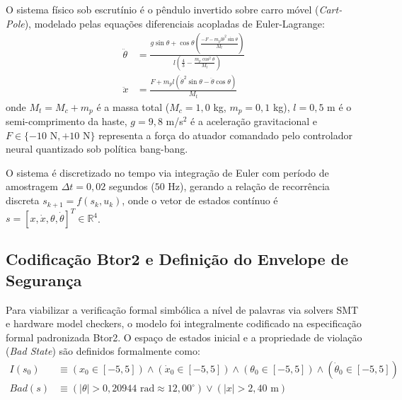 \documentclass[11pt,a4paper]{article}
\theoremstyle{definition}
\begin{document}
O sistema físico sob escrutínio é o pêndulo invertido sobre carro móvel (\textit{Cart-Pole}), modelado pelas equações diferenciais acopladas de Euler-Lagrange:
\begin{align}
    \ddot{\theta} &= \frac{g \sin\theta + \cos\theta \left( \frac{-F - m_p l \dot{\theta}^2 \sin\theta}{M_t} \right)}{l \left( \frac{4}{3} - \frac{m_p \cos^2\theta}{M_t} \right)} \\
    \ddot{x} &= \frac{F + m_p l (\dot{\theta}^2 \sin\theta - \ddot{\theta} \cos\theta)}{M_t}
\end{align}
onde $M_t = M_c + m_p$ é a massa total ($M_c = 1,0$ kg, $m_p = 0,1$ kg), $l = 0,5$ m é o semi-comprimento da haste, $g = 9,8$ m/s$^2$ é a aceleração gravitacional e $F \in \{-10\text{ N}, +10\text{ N}\}$ representa a força do atuador comandado pelo controlador neural quantizado sob política bang-bang.

O sistema é discretizado no tempo via integração de Euler com período de amostragem $\Delta t = 0,02$ segundos ($50$ Hz), gerando a relação de recorrência discreta $s_{k+1} = f(s_k, u_k)$, onde o vetor de estados contínuo é $s = [x, \dot{x}, \theta, \dot{\theta}]^T \in \mathbb{R}^4$.

\subsection{Codificação Btor2 e Definição do Envelope de Segurança}

Para viabilizar a verificação formal simbólica a nível de palavras via solvers SMT e hardware model checkers, o modelo foi integralmente codificado na especificação formal padronizada Btor2. O espaço de estados inicial e a propriedade de violação (\textit{Bad State}) são definidos formalmente como:
\begin{align}
    I(s_0) &\equiv (x_0 \in [-5, 5]) \land (\dot{x}_0 \in [-5, 5]) \land (\theta_0 \in [-5, 5]) \land (\dot{\theta}_0 \in [-5, 5]) \\
    Bad(s) &\equiv (|\theta| > 0{,}20944\text{ rad} \approx 12{,}00^\circ) \lor (|x| > 2{,}40\text{ m})
\end{align}
\end{document}
